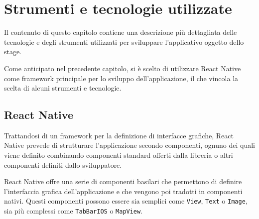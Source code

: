 
\chapter{Strumenti e tecnologie utilizzate}
\label{cap:strumenti-tecnologie}

Il contenuto di questo capitolo contiene una descrizione più dettagliata delle tecnologie e degli strumenti utilizzati per sviluppare l'applicativo oggetto dello stage.

Come anticipato nel precedente capitolo, si è scelto di utilizzare React Native come framework principale per lo sviluppo dell'applicazione, il che vincola la scelta di alcuni strumenti e tecnologie.

\section{React Native}

Trattandosi di un framework per la definizione di interfacce grafiche, React Native prevede di strutturare l'applicazione secondo componenti, ognuno dei quali viene definito combinando componenti standard offerti dalla libreria o altri componenti definiti dallo sviluppatore.

React Native offre una serie di componenti basilari che permettono di definire l'interfaccia grafica dell'applicazione e che vengono poi tradotti in componenti nativi. Questi componenti possono essere sia semplici come \texttt{View}, \texttt{Text} o \texttt{Image}, sia più complessi come \texttt{TabBarIOS} o \texttt{MapView}.


